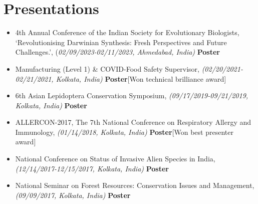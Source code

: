 \documentclass[a4paper,11pt]{article}
\begin{document}
\section{Presentations} 

    \normalsize{{
    \begin{itemize}
        \item { 4th Annual Conference of the Indian Society for Evolutionary Biologists, ‘Revolutionising Darwinian Synthesis: Fresh Perspectives and Future Challenges.’, (\textit{02/09/2023-02/11/2023, Ahmedabad, India)}}{\textbf{ Poster}} \\
    \end{itemize}
    \begin{itemize}
        \item {Manufacturing (Level 1) \& COVID-Food Safety Supervisor, \textit{(02/20/2021-02/21/2021, Kolkata, India)}}{\textbf{ Poster}[Won technical brilliance award]}
    \end{itemize}
    \begin{itemize}
        \item {6th Asian Lepidoptera Conservation Symposium, \textit{(09/17/2019-09/21/2019, Kolkata, India)}}{\textbf{ Poster}}
    \end{itemize}
    \begin{itemize}
        \item {ALLERCON-2017, The 7th National Conference on Respiratory Allergy and Immunology, \textit{(01/14/2018, Kolkata, India)}}{\textbf{ Poster}[Won best presenter award]}
    \end{itemize}
    \begin{itemize}
        \item {National Conference on Status of Invasive Alien Species in India, \textit{(12/14/2017-12/15/2017, Kolkata, India)}}{\textbf{ Poster}}
    \end{itemize}
    \begin{itemize}
        \item {National Seminar on Forest Resources: Conservation Issues and Management, \textit{(09/09/2017, Kolkata, India)}}{\textbf{ Poster}}
    \end{itemize}
}}


\end{document}
